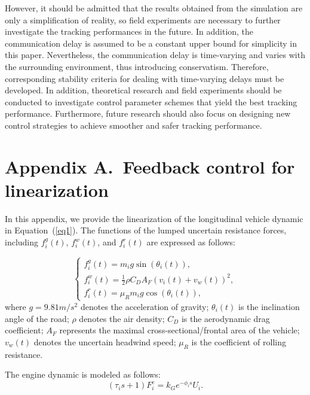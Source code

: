 \documentclass[journal]{IEEEtran}
\begin{document}
However, it should be admitted that the results obtained from the simulation are only a simplification of reality, so field experiments are necessary to further investigate the tracking performances in the future. In addition, the communication delay is assumed to be a constant upper bound for simplicity in this paper. Nevertheless, the communication delay is time-varying and varies with the surrounding environment, thus introducing conservatism. Therefore, corresponding stability criteria for dealing with time-varying delays must be developed. In addition, theoretical research and field experiments should be conducted to investigate control parameter schemes that yield the best tracking performance. Furthermore, future research should also focus on designing new control strategies to achieve smoother and safer tracking performance.

\appendix


\section*{Appendix A.~Feedback control for linearization}
\label{AppendixA}
In this appendix, we provide the linearization of the longitudinal vehicle dynamic in Equation~(\ref{eq1}). The functions of the lumped uncertain resistance forces, including $f_i^g(t)$, $f_i^w(t)$, and $f_i^r(t)$ are expressed as follows:

\begin{equation}
  \left\{\begin{array}{l}
    f_{i}^{g}(t)=m_{i} g \sin \left(\theta_{i}(t)\right),                         \\
    f_{i}^{w}(t)=\frac{1}{2} \rho C_{D} A_{F}\left(v_{i}(t)+v_{w}(t)\right)^{2} , \\
    f_{i}^{r}(t)=\mu_{R} m_{i} g \cos \left(\theta_{i}(t)\right),
  \end{array}\right.
  \label{eqA1}
\end{equation}
where $g=9.81m/s^2$ denotes the acceleration of gravity; $\theta_i(t)$ is the inclination angle of the road; $\rho$ denotes the air density; $C_D$ is the aerodynamic drag coefficient; $A_F$ represents the maximal cross-sectional/frontal area of the vehicle; $v_w(t)$ denotes the uncertain headwind speed; $\mu_R$ is the coefficient of rolling resistance.

The engine dynamic is modeled as follows:
\begin{equation}
  \left(\tau_is+1\right)F_i^e=k_Ge^{-\phi_is}U_i.
  \label{eqA2}
\end{equation}
\end{document}
